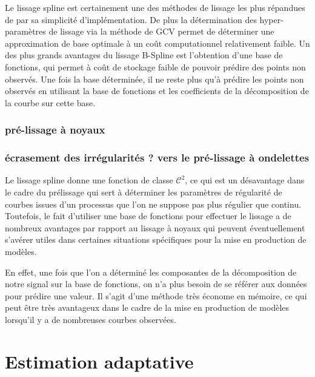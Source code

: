 Le lissage spline est certainement une des méthodes de lissage les plus répandues de par sa simplicité d'implémentation. De plus la détermination des hyper-paramètres de lissage via la méthode de GCV permet de déterminer une approximation de base optimale à un coût computationnel relativement faible. Un des plus grands avantages du lissage B-Spline est l'obtention d'une base de fonctions, qui permet à coût de stockage faible de pouvoir prédire des points non observés. Une fois la base déterminée, il ne reste plus qu'à prédire les points non observés en utilisant la base de fonctions et les coefficients de la décomposition de la courbe sur cette base.

\bigskip



\subsubsection{pré-lissage à noyaux}



\subsubsection{écrasement des irrégularités ? vers le pré-lissage à ondelettes}

Le lissage spline donne une fonction de classe $\mathcal C^2$, ce qui est un désavantage dans le cadre du prélissage qui sert à déterminer les paramètres de régularité de courbes issues d'un processus que l'on ne suppose pas plus régulier que continu. Toutefois, le fait d'utiliser une base de fonctions pour effectuer le lissage a de nombreux avantages par rapport au lissage à noyaux qui peuvent éventuellement s'avérer utiles dans certaines situations spécifiques pour la mise en production de modèles.

En effet, une fois que l'on a déterminé les composantes de la décomposition de notre signal sur la base de fonctions, on n'a plus besoin de se référer aux données pour prédire une valeur. Il s'agit d'une méthode très économe en mémoire, ce qui peut être très avantageux dans le cadre de la mise en production de modèles lorsqu'il y a de nombreuses courbes observées.





\section{Estimation adaptative}

